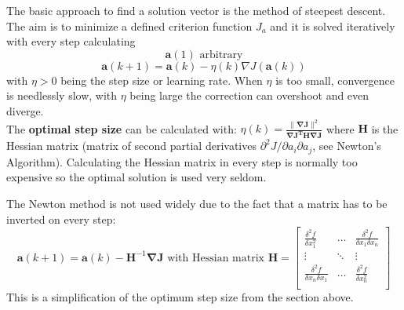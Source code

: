       The basic approach to find a solution vector is the method of steepest descent. The aim is to
      minimize a defined criterion function $J_a$ and it is solved iteratively with every step calculating
      $$\bm a (1) \text{ arbitrary}$$
      $$\bm a (k+1) =  \bm a(k) - \eta(k) \nabla J(\bm a(k))$$
      with $\eta > 0$ being the step size or learning rate. When $\eta$ is too small, convergence is
      needlessly slow, with $\eta$ being large the correction can overshoot and even diverge.\\
      The \textbf{optimal step size} can be calculated with:
      $\eta(k)= \frac{\|\bm{\nabla J}\|^2}{\bm{\nabla J^T  H \nabla J}}$ where $\bm H$ is the Hessian matrix
       (matrix of second partial derivatives $\partial^2 J / \partial a_i \partial a_j$, see Newton's Algorithm).
      Calculating the Hessian matrix in every step is normally too expensive so the optimal solution is used very seldom.

      The Newton method is not used widely due to the fact that a matrix has to be inverted on every
      step:
      $$\bm a(k+1) = \bm a(k) - \bm H^{-1} \bm \nabla \bm J \text{ with Hessian matrix } \bm H = \begin{bmatrix}
      \frac{\delta^2 f}{\delta x_1^2} & \ldots & \frac{\delta^2 f}{\delta x_1 \delta x_n}\\
      \vdots & \ddots & \vdots \\
      \frac{\delta^2 f}{\delta x_n \delta x_1} & \ldots & \frac{\delta^2 f}{\delta x_n^2}\\
      \end{bmatrix}$$
      This is a simplification of the optimum step size from the section above.
  
